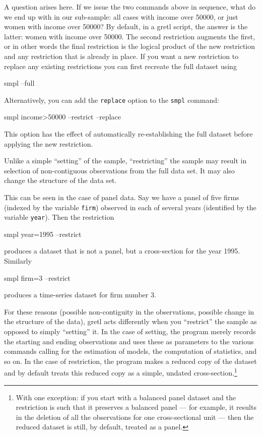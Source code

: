 A question arises here.  If we issue the two commands above in
sequence, what do we end up with in our sub-sample: all cases with
income over 50000, or just women with income over 50000? By default,
in a gretl script, the answer is the latter: women with income over
50000.  The second restriction augments the first, or in other words
the final restriction is the logical product of the new restriction
and any restriction that is already in place.  If you want a new
restriction to replace any existing restrictions you can first
recreate the full dataset using
%
\begin{code}
    smpl --full
\end{code}
%
Alternatively, you can add the \verb+replace+ option to the
\verb+smpl+ command:
%
\begin{code}
    smpl income>50000 --restrict --replace
\end{code}

This option has the effect of automatically re-establishing the full
dataset before applying the new restriction.

Unlike a simple ``setting'' of the sample, ``restricting'' the sample
may result in selection of non-contiguous observations from the full
data set.  It may also change the structure of the data set.

This can be seen in the case of panel data.  Say we have a panel of
five firms (indexed by the variable \verb+firm+) observed in each of
several years (identified by the variable \verb+year+).  Then the
restriction
%
\begin{code}
    smpl year=1995 --restrict
\end{code}
%
produces a dataset that is not a panel, but a cross-section for the
year 1995.  Similarly
%
\begin{code}
    smpl firm=3 --restrict
\end{code}
%
produces a time-series dataset for firm number 3.

For these reasons (possible non-contiguity in the observations,
possible change in the structure of the data), gretl acts differently
when you ``restrict'' the sample as opposed to simply ``setting'' it.
In the case of setting, the program merely records the starting and
ending observations and uses these as parameters to the various
commands calling for the estimation of models, the computation of
statistics, and so on. In the case of restriction, the program makes a
reduced copy of the dataset and by default treats this reduced copy as
a simple, undated cross-section.\footnote{With one exception: if you
  start with a balanced panel dataset and the restriction is such that
  it preserves a balanced panel --- for example, it results in the
  deletion of all the observations for one cross-sectional unit ---
  then the reduced dataset is still, by default, treated as a panel.}

